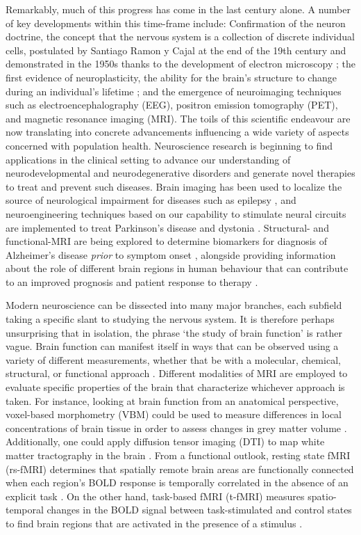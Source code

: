 Remarkably, much of this progress has come in the last century alone. A number of key developments within this time-frame include: Confirmation of the neuron doctrine, the concept that the nervous system is a collection of discrete individual cells, postulated by Santiago Ramon y Cajal at the end of the 19th century and demonstrated in the 1950s thanks to the development of electron microscopy \citep{Lopez-Munoz2006-zk}; the first evidence of neuroplasticity, the ability for the brain's structure to change during an individual's lifetime \citep{Diamond1964-cu, Bennett1964-vx}; and the emergence of neuroimaging techniques such as electroencephalography (EEG), positron emission tomography (PET), and magnetic resonance imaging (MRI). The toils of this scientific endeavour are now translating into concrete advancements influencing a wide variety of aspects concerned with population health. Neuroscience research is beginning to find applications in the clinical setting to advance our understanding of neurodevelopmental and neurodegenerative disorders and generate novel therapies to treat and prevent such diseases. Brain imaging has been used to localize the source of neurological impairment for diseases such as epilepsy \citep{Stacey2008-qx}, and neuroengineering techniques based on our capability to stimulate neural circuits are implemented to treat Parkinson's disease \citep{Kalia2013-bv} and dystonia \citep{Fox2015-ds}. Structural- and functional-MRI are being explored to determine biomarkers for diagnosis of Alzheimer's disease \textit{prior} to symptom onset \citep{Sperling2014-sy, McEvoy2009-zx}, alongside providing information about the role of different brain regions in human behaviour that can contribute to an improved prognosis and patient response to therapy \citep{Matthews2006-sl}.  

Modern neuroscience can be dissected into many major branches, each subfield taking a specific slant to studying the nervous system. It is therefore perhaps unsurprising that in isolation, the phrase `the study of brain function' is rather vague. Brain function can manifest itself in ways that can be observed using a variety of different measurements, whether that be with a molecular, chemical, structural, or functional approach \citep{Hargreaves2012-dz}. Different modalities of MRI are employed to evaluate specific properties of the brain that characterize whichever approach is taken. For instance, looking at brain function from an anatomical perspective, voxel-based morphometry (VBM) could be used to measure differences in local concentrations of brain tissue in order to assess changes in grey matter volume \citep{Mechelli2005-dn}. Additionally, one could apply diffusion tensor imaging (DTI) to map white matter tractography in the brain \citep{Alexander2007-ut, Soares2013-mh}. From a functional outlook, resting state fMRI (rs-fMRI) determines that spatially remote brain areas are functionally connected when each region's BOLD response is temporally correlated in the absence of an explicit task \citep{Lee2013-kn}. On the other hand, task-based fMRI (t-fMRI) measures spatio-temporal changes in the BOLD signal between task-stimulated and control states to find brain regions that are activated in the presence of a stimulus \citep{Glover2011-at}. 

